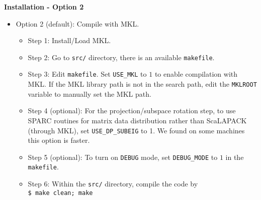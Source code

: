   \begin{frame}{\textbf{Installation - Option 2}} \label{Installation:2}
  
  \begin{itemize}
  \item Option 2 (default): Compile with MKL.
    \begin{itemize}
      \item Step 1: Install/Load MKL.
      \item Step 2: Go to \texttt{src/} directory, there is an available \texttt{makefile}.
      \item Step 3: Edit \texttt{makefile}. Set \texttt{USE\_MKL} to $1$ to enable compilation with MKL. If the MKL library path is not in the search path, edit the \texttt{MKLROOT} variable to manually set the MKL path.
      \item Step 4 (optional): For the projection/subspace rotation step, to use SPARC routines for matrix data distribution rather than ScaLAPACK (through MKL), set \texttt{USE\_DP\_SUBEIG} to 1. We found on some machines this option is faster.
      \item Step 5 (optional): To turn on \texttt{DEBUG} mode, set \texttt{DEBUG\_MODE} to $1$ in the \texttt{makefile}.
      \item Step 6: Within the \texttt{src/} directory, compile the code by \\
            \texttt{\$ make clean; make}
    \end{itemize}
  \end{itemize}
  
  \end{frame}
  
